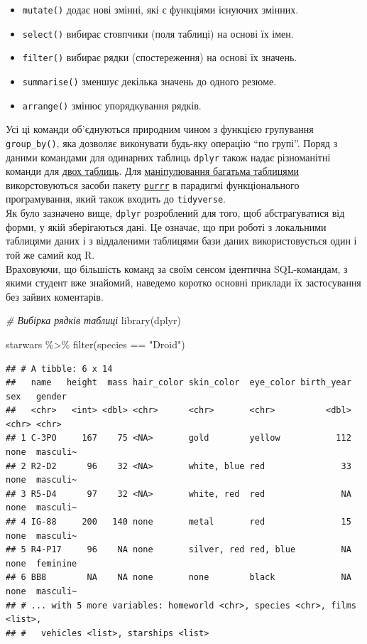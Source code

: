 \documentclass[
]{book}
\newenvironment{Shaded}{\begin{snugshade}}{\end{snugshade}}
\newcommand{\CommentTok}[1]{\textcolor[rgb]{0.56,0.35,0.01}{\textit{#1}}}
\newcommand{\FunctionTok}[1]{\textcolor[rgb]{0.00,0.00,0.00}{#1}}
\newcommand{\NormalTok}[1]{#1}
\newcommand{\SpecialCharTok}[1]{\textcolor[rgb]{0.00,0.00,0.00}{#1}}
\newcommand{\StringTok}[1]{\textcolor[rgb]{0.31,0.60,0.02}{#1}}
\providecommand{\tightlist}{%
  \setlength{\itemsep}{0pt}\setlength{\parskip}{0pt}}
\begin{document}
\begin{itemize}
\tightlist
\item
  \texttt{mutate()} додає нові змінні, які є функціями існуючих змінних.
\item
  \texttt{select()} вибирає стовпчики (поля таблиці) на основі їх імен.
\item
  \texttt{filter()} вибирає рядки (спостереження) на основі їх значень.
\item
  \texttt{summarise()} зменшує декілька значень до одного резюме.
\item
  \texttt{arrange()} змінює упорядкування рядків.
\end{itemize}

Усі ці команди об'єднуються природним чином з функцією групування \texttt{group\_by()}, яка дозволяє виконувати будь-яку операцію ``по групі''. Поряд з даними командами для одинарних таблиць \texttt{dplyr} також надає різноманітні команди для \href{https://dplyr.tidyverse.org/articles/two-table.html}{двох таблиць}. Для \href{http://adv-r.had.co.nz/Functionals.html\#functionals-fp}{маніпулювання багатьма таблицями} викорстовуються засоби пакету \href{https://purrr.tidyverse.org/}{\texttt{purrr}} в парадигмі функціонального програмування, який також входить до \texttt{tidyverse}.\\
Як було зазначено вище, \texttt{dplyr} розроблений для того, щоб абстрагуватися від форми, у якій зберігаються дані. Це означає, що при роботі з локальними таблицями даних і з віддаленими таблицями бази даних використовується один і той же самий код R.\\
Враховуючи, що більшість команд за своїм сенсом ідентична SQL-командам, з якими студент вже знайомий, наведемо коротко основні приклади їх застосування без зайвих коментарів.

\begin{Shaded}
\begin{Highlighting}[]
\CommentTok{\# Вибірка рядків таблиці}
\FunctionTok{library}\NormalTok{(dplyr)}

\NormalTok{starwars }\SpecialCharTok{\%\textgreater{}\%} 
  \FunctionTok{filter}\NormalTok{(species }\SpecialCharTok{==} \StringTok{"Droid"}\NormalTok{)}
\end{Highlighting}
\end{Shaded}

\begin{verbatim}
## # A tibble: 6 x 14
##   name   height  mass hair_color skin_color  eye_color birth_year sex   gender  
##   <chr>   <int> <dbl> <chr>      <chr>       <chr>          <dbl> <chr> <chr>   
## 1 C-3PO     167    75 <NA>       gold        yellow           112 none  masculi~
## 2 R2-D2      96    32 <NA>       white, blue red               33 none  masculi~
## 3 R5-D4      97    32 <NA>       white, red  red               NA none  masculi~
## 4 IG-88     200   140 none       metal       red               15 none  masculi~
## 5 R4-P17     96    NA none       silver, red red, blue         NA none  feminine
## 6 BB8        NA    NA none       none        black             NA none  masculi~
## # ... with 5 more variables: homeworld <chr>, species <chr>, films <list>,
## #   vehicles <list>, starships <list>
\end{verbatim}
\end{document}
